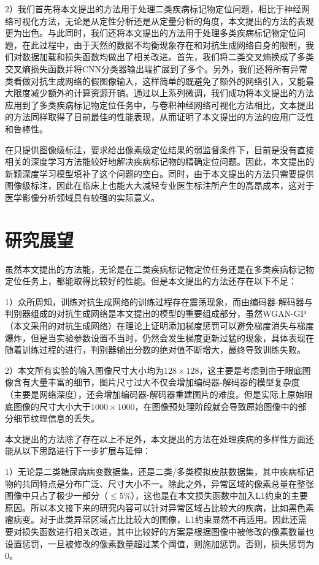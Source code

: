 2）我们首先将本文提出的方法用于处理二类疾病标记物定位问题，相比于神经网络可视化方法，无论是从定性分析还是从定量分析的角度，本文提出的方法的表现更为出色。与此同时，我们还将本文提出的方法用于处理多类疾病标记物定位问题，在此过程中，由于天然的数据不均衡现象存在和对抗生成网络自身的限制，我们对数据加载和损失函数均做出了相关改进。首先，我们将二类交叉熵换成了多类交叉熵损失函数并将CNN分类器输出端扩展到了多个。另外，我们还将所有异常类看做对抗生成网络的假图像输入，这样简单的既避免了额外的网络引入，又能最大限度减少额外的计算资源开销。通过以上系列微调，我们成功将本文提出的方法应用到了多类疾病标记物定位任务中，与卷积神经网络可视化方法相比，文本提出的方法同样取得了目前最佳的性能表现，从而证明了本文提出的方法的应用广泛性和鲁棒性。

在只提供图像级标注，要求给出像素级定位结果的弱监督条件下，目前是没有直接相关的深度学习方法能较好地解决疾病标记物的精确定位问题。因此，本文提出的新颖深度学习模型填补了这个问题的空白。同时，由于本文提出的方法只需要提供图像级标注，因此在临床上也能大大减轻专业医生标注所产生的高昂成本，这对于医学影像分析领域具有较强的实际意义。

\section{研究展望}

虽然本文提出的方法能，无论是在二类疾病标记物定位任务还是在多类疾病标记物定位任务上，都能取得比较好的性能。但是本文提出的方法还存在以下不足：

1）众所周知，训练对抗生成网络的训练过程存在震荡现象，而由编码器-解码器与判别器组成的对抗生成网络是本文提出的模型的重要组成部分，虽然WGAN-GP（本文采用的对抗生成网络）在理论上证明添加梯度惩罚可以避免梯度消失与梯度爆炸，但是当实验参数设置不当时，仍然会发生梯度更新过猛的现象，具体表现在随着训练过程的进行，判别器输出分数的绝对值不断增大，最终导致训练失败。

2）本文所有实验的输入图像尺寸大小均为$128\times 128$，这主要是考虑到由于眼底图像含有大量丰富的细节，图片尺寸过大不仅会增加编码器-解码器的模型复杂度（主要是网络深度），还会增加编码器-解码器重建图片的难度。但是实际上原始眼底图像的尺寸大小大于$1000\times 1000$，在图像预处理阶段就会导致原始图像中的部分细节纹理信息的丢失。

本文提出的方法除了存在以上不足外，本文提出的方法在处理疾病的多样性方面还能从以下思路进行下一步扩展与延伸：

1）无论是二类糖尿病病变数据集，还是二类/多类模拟皮肤数据集，其中疾病标记物的共同特点是分布广泛、尺寸大小不一。除此之外，异常区域的像素总量在整张图像中只占了极少一部分（$\le 5\%$），这也是在本文损失函数中加入L1约束的主要原因。所以本文接下来的研究内容可以针对异常区域占比较大的疾病，比如黑色素瘤病变。对于此类异常区域占比比较大的图像，L1约束显然不再适用。因此还需要对损失函数进行相关改进，其中比较好的方案是根据图像中被修改的像素数量也设置惩罚，一旦被修改的像素数量超过某个阈值，则施加惩罚。否则，损失惩罚为$0$。

